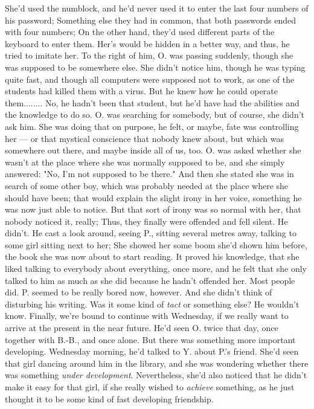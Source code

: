 She'd used the numblock, and he'd never used it to enter the last four numbers of his password; Something else they had in common, that both passwords ended with four numbers; On the other hand, they'd used different parts of the keyboard to enter them. 
Her's would be hidden in a better way, and thus, he tried to imitate her. 
To the right of him, O. was passing suddenly, though she was supposed to be somewhere else. 
She didn't notice him, though he was typing quite fast, and though all computers were supposed not to work, as one of the students had killed them with a virus. But he knew how he could operate them........
No, he hadn't been that student, but he'd have had the abilities and the knowledge to do so. 
O. was searching for somebody, but of course, she didn't ask him. She was doing that on purpose, he felt, or maybe, fate was controlling her --- or that mystical conscience that nobody knew about, but which was somewhere out there, and maybe inside all of us, too. 
O. was asked whether she wasn't at the place where she was normally supposed to be, and she simply answered: "No, I'm not supposed to be there."
And then she stated she was in search of some other boy, which was probably needed at the place where she should have been; that would explain the slight irony in her voice, something he was now just able to notice. 
But that sort of irony was so normal with her, that nobody noticed it, really; Thus, they finally were offended and fell silent. He didn't. He cast a look around, seeing P., sitting several metres away, talking to some girl sitting next to her; She showed her some boom she'd shown him before, the book she was now about to start reading. It proved his knowledge, that she liked talking to everybody about everything, once more, and he felt that she only talked to him as much as she did because he hadn't offended her. 
Most people did. 
P. seemed to be really bored now, however. And she didn't think of disturbing his writing. Was it some kind of \emph{tact} or something else?
He wouldn't know. 
Finally, we're bound to continue with Wednesday, if we really want to arrive at the present in the near future. 
He'd seen O. twice that day, once together with B.-B., and once alone. 
But there was something more important developing. 
Wednesday morning, he'd talked to Y. about P.'s friend. 
She'd seen that girl dancing around him in the library, and she was wondering whether there was something \emph{under development}. Nevertheless, she'd also noticed that he didn't make it easy for that girl, if she really wished to \emph{achieve} something, as he just thought it to be some kind of fast developing friendship. 
